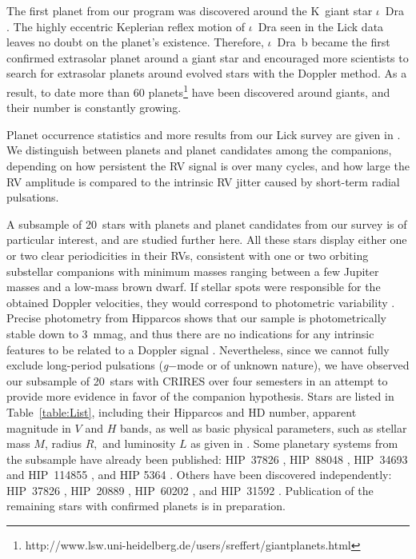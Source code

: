 \documentclass{aa}
\begin{document}
The first planet from our program was discovered around the K~giant star $\iota$~Dra \citep{Frink2}. 
The highly eccentric Keplerian reflex motion of $\iota$~Dra seen in the Lick data leaves no doubt on the planet's existence. 
Therefore, $\iota$~Dra~b became the first confirmed extrasolar planet around a giant star and encouraged
more scientists to search for extrasolar planets around evolved stars with the Doppler method. As a result, 
 to date more than 60 planets\footnote{http://www.lsw.uni-heidelberg.de/users/sreffert/giantplanets.html}
have been discovered around giants, and their number is constantly growing.

Planet occurrence statistics and more results from our Lick survey are given in \citet{Reffert2014}.
We distinguish between planets and planet candidates among the companions,
depending on how persistent the RV signal is over many cycles, and how large
the RV amplitude is compared to the intrinsic RV jitter caused by short-term radial pulsations.

 
A subsample of 20~stars with planets and planet candidates from our survey is 
of particular interest, and are studied further here. 
All these stars display either one or two clear periodicities in their RVs,
consistent with one or two orbiting substellar companions with minimum masses ranging between
a few Jupiter masses and a low-mass brown dwarf.
If stellar spots were responsible for the obtained Doppler velocities, they would correspond 
to photometric variability \citep{Hatzes2002}.
Precise photometry from Hipparcos shows that our sample is photometrically
stable down to 3~mmag, and thus there are no indications for any intrinsic 
features to be related to a Doppler signal \citep{Reffert2014}.
Nevertheless, since we cannot fully exclude long-period pulsations 
(\textit{g}$-$mode or of unknown nature), we have observed our subsample of 20~stars with CRIRES over four semesters
in an attempt to provide more evidence in favor of the companion hypothesis.
Stars are listed in Table~\ref{table:List}, including their Hipparcos and HD number, apparent magnitude in $V$ and $H$ bands,
as well as basic physical parameters, such as stellar mass $M$, radius $R,$ and luminosity $L$ as  given in \citet{Reffert2014}.
Some planetary systems from the subsample have already been published: 
HIP~37826  \citep{Reffert}, HIP~88048  \citep{Quirrenbach}, HIP~34693 and HIP~114855 \citep{Mitchell2013}, and HIP 5364  \citep{Trifonov2014}.
 Others have been discovered independently: 
HIP~37826  \citep{Hatzes}, HIP~20889  \citep{Sato2007}, HIP~60202  \citep{Liu2008}, and HIP~31592  \citep{Wittenmyer2011}.
 Publication of the remaining stars with confirmed planets is in preparation.
\end{document}
